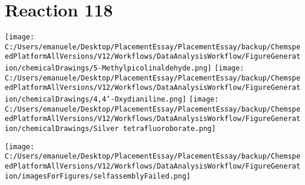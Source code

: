 \documentclass{article}%
\begin{document}
\section*{Reaction 118}%
%
\begin{scheme}[H]%
\begin{minipage}{0.5\textwidth}%
\texttt{[image: C:/Users/emanuele/Desktop/PlacementEssay/PlacementEssay/backup/ChemspeedPlatformAllVersions/V12/Workflows/DataAnalysisWorkflow/FigureGeneration/chemicalDrawings/5-Methylpicolinaldehyde.png]}%
\texttt{[image: C:/Users/emanuele/Desktop/PlacementEssay/PlacementEssay/backup/ChemspeedPlatformAllVersions/V12/Workflows/DataAnalysisWorkflow/FigureGeneration/chemicalDrawings/4,4'-Oxydianiline.png]}%
\texttt{[image: C:/Users/emanuele/Desktop/PlacementEssay/PlacementEssay/backup/ChemspeedPlatformAllVersions/V12/Workflows/DataAnalysisWorkflow/FigureGeneration/chemicalDrawings/Silver tetrafluoroborate.png]}%
\end{minipage}%
\begin{minipage}{0.5\textwidth}%
\begin{center}%
\texttt{[image: C:/Users/emanuele/Desktop/PlacementEssay/PlacementEssay/backup/ChemspeedPlatformAllVersions/V12/Workflows/DataAnalysisWorkflow/FigureGeneration/imagesForFigures/selfassemblyFailed.png]}%
\end{center}%
\end{minipage}%
\caption{Self-assembly of components 3, 15, with Silver(I) in a 3.0:1.5:1.0 molar ratio in CH$_3$CN at 60\textdegree C for 40h. These are the reagents (starting materials) for reaction 118.}%
\end{scheme}%
\end{document}
